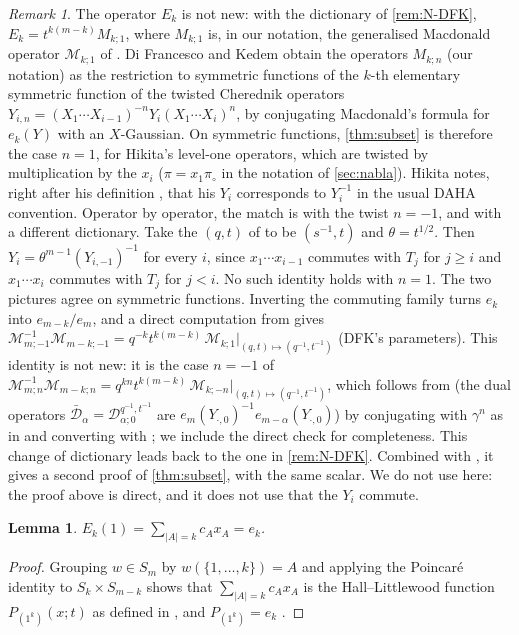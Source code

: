 \documentclass[11pt]{amsart}
\newtheorem{lemma}[theorem]{Lemma}
\theoremstyle{definition}
\theoremstyle{remark}
\newtheorem{remark}[theorem]{Remark}
\numberwithin{equation}{section}
\begin{document}
\begin{remark}
The operator $E_k$ is not new: with the dictionary of \cref{rem:N-DFK}, $E_k=t^{k(m-k)}M_{k;1}$, where $M_{k;1}$ is, in our notation, the generalised Macdonald operator $\mathcal M_{k;1}$ of \cite[(1.5)]{DFK19}. Di Francesco and Kedem \cite[Def.~2.6, Thm.~2.17]{DFK19} obtain the operators $M_{k;n}$ (our notation) as the restriction to symmetric functions of the $k$-th elementary symmetric function of the twisted Cherednik operators $Y_{i,n}=(X_1\cdots X_{i-1})^{-n}Y_i(X_1\cdots X_i)^n$, by conjugating Macdonald's formula for $e_k(Y)$ with an $X$-Gaussian. On symmetric functions, \cref{thm:subset} is therefore the case $n=1$, for Hikita's level-one operators, which are twisted by multiplication by the $x_i$ ($\pi=x_1\pi_\circ$ in the notation of \cref{sec:nabla}). Hikita notes, right after his definition \cite[(3)]{Hikita25}, that his $Y_i$ corresponds to $Y_i^{-1}$ in the usual DAHA convention. Operator by operator, the match is with the twist $n=-1$, and with a different dictionary. Take the $(q,t)$ of \cite{DFK19} to be $(s^{-1},t)$ and $\theta=t^{1/2}$. Then $Y_i=\theta^{m-1}(Y_{i,-1})^{-1}$ for every $i$, since $x_1\cdots x_{i-1}$ commutes with $T_j$ for $j\ge i$ and $x_1\cdots x_i$ commutes with $T_j$ for $j<i$. No such identity holds with $n=1$. The two pictures agree on symmetric functions. Inverting the commuting family turns $e_k$ into $e_{m-k}/e_m$, and a direct computation from \cite[(1.5)]{DFK19} gives $\mathcal M_{m;-1}^{-1}\mathcal M_{m-k;-1}=q^{-k}t^{k(m-k)}\,\mathcal M_{k;1}|_{(q,t)\mapsto(q^{-1},t^{-1})}$ (DFK's parameters). This identity is not new: it is the case $n=-1$ of $\mathcal M_{m;n}^{-1}\mathcal M_{m-k;n}=q^{kn}t^{k(m-k)}\,\mathcal M_{k;-n}|_{(q,t)\mapsto(q^{-1},t^{-1})}$, which follows from \cite[(6.7)]{DFK19} (the dual operators $\bar{\mathcal D}_\alpha=\mathcal D^{q^{-1},t^{-1}}_{\alpha;0}$ are $e_m(Y_{\cdot,0})^{-1}e_{m-\alpha}(Y_{\cdot,0})$) by conjugating with $\gamma^n$ as in \cite[Lemma~2.16]{DFK19} and converting with \cite[Thm.~2.17]{DFK19}; we include the direct check for completeness. This change of dictionary leads back to the one in \cref{rem:N-DFK}. Combined with \cite[Thm.~2.17]{DFK19}, it gives a second proof of \cref{thm:subset}, with the same scalar. We do not use \cite{DFK19} here: the proof above is direct, and it does not use that the $Y_i$ commute.
\end{remark}

\begin{lemma}\label{lem:Ek1}
$E_k(1)=\sum_{|A|=k}c_Ax_A=e_k$.
\end{lemma}
\begin{proof}
Grouping $w\in S_m$ by $w(\{1,\dots,k\})=A$ and applying the Poincar\'e identity to $S_k\times S_{m-k}$ shows that $\sum_{|A|=k}c_Ax_A$ is the Hall--Littlewood function $P_{(1^k)}(x;t)$ as defined in \cite[III (2.1)--(2.2)]{Macdonald95}, and $P_{(1^k)}=e_k$ \cite[III (2.8)]{Macdonald95}.
\end{proof}
\end{document}
